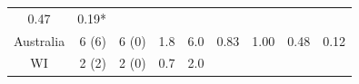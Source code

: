 \documentclass[fleqn,10pt,lineno]{wlpeerj} %
\theoremstyle{definition}
\theoremstyle{definition}
\theoremstyle{definition}
\theoremstyle{remark}
\begin{document}
\begin{longtable}[]{@{}crrrrllrl@{}}
\begin{minipage}[t]{0.06\columnwidth}
0.47\strut
\end{minipage} & \begin{minipage}[t]{0.07\columnwidth}\raggedright\strut
0.19*\strut
\end{minipage}\tabularnewline
\begin{minipage}[t]{0.12\columnwidth}\centering\strut
Australia\strut
\end{minipage} & \begin{minipage}[t]{0.08\columnwidth}\raggedleft\strut
6 (6)\strut
\end{minipage} & \begin{minipage}[t]{0.13\columnwidth}\raggedleft\strut
6 (0)\strut
\end{minipage} & \begin{minipage}[t]{0.04\columnwidth}\raggedleft\strut
1.8\strut
\end{minipage} & \begin{minipage}[t]{0.05\columnwidth}\raggedleft\strut
6.0\strut
\end{minipage} & \begin{minipage}[t]{0.11\columnwidth}\raggedright\strut
0.83\strut
\end{minipage} & \begin{minipage}[t]{0.06\columnwidth}\raggedright\strut
1.00\strut
\end{minipage} & \begin{minipage}[t]{0.06\columnwidth}\raggedleft\strut
0.48\strut
\end{minipage} & \begin{minipage}[t]{0.07\columnwidth}\raggedright\strut
0.12\strut
\end{minipage}\tabularnewline
\begin{minipage}[t]{0.12\columnwidth}\centering\strut
WI\strut
\end{minipage} & \begin{minipage}[t]{0.08\columnwidth}\raggedleft\strut
2 (2)\strut
\end{minipage} & \begin{minipage}[t]{0.13\columnwidth}\raggedleft\strut
2 (0)\strut
\end{minipage} & \begin{minipage}[t]{0.04\columnwidth}\raggedleft\strut
0.7\strut
\end{minipage} & \begin{minipage}[t]{0.05\columnwidth}\raggedleft\strut
2.0\strut
\end{minipage} & \begin{minipage}[t]{0.11\columnwidth}\raggedright\strut

\end{minipage}
\end{longtable}
\end{document}
